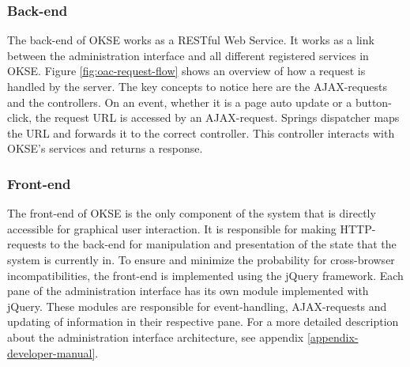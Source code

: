 \subsubsection{Back-end}

The back-end of OKSE works as a RESTful Web Service. It works as a link between the administration interface and all different registered services in OKSE. Figure \ref{fig:oac-request-flow} shows an overview of how a request is handled by the server. The key concepts to notice here are the AJAX-requests and the controllers. On an event, whether it is a page auto update or a button-click, the request URL is accessed by an AJAX-request. Springs dispatcher maps the URL and forwards it to the correct controller. This controller interacts with OKSE's services and returns a response. 

\subsubsection{Front-end}

The front-end of OKSE is the only component of the system that is directly accessible for graphical user interaction. It is responsible for making HTTP-requests to the back-end for manipulation and presentation of the state that the system is currently in. To ensure and minimize the probability for cross-browser incompatibilities, the front-end is implemented using the jQuery framework. Each pane of the administration interface has its own module implemented with jQuery. These modules are responsible for event-handling, AJAX-requests and updating of information in their respective pane.
For a more detailed description about the administration interface architecture, see appendix \ref{appendix-developer-manual}.

\clearpage
